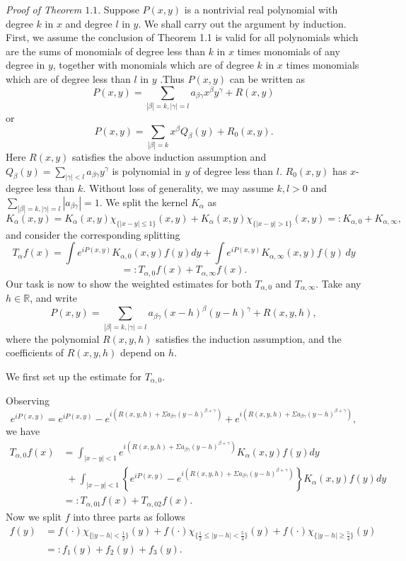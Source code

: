 \documentclass[reqno,12pt]{amsart}
\numberwithin{equation}{section}
\theoremstyle{plain}
\theoremstyle{definition}
\begin{document}
{\it Proof of Theorem $1.1$}. Suppose $P(x,y)$ is a nontrivial real polynomial with degree $k$ in $x$ and degree $l$ in $y$. We shall carry out the argument by induction. First, we assume the conclusion of Theorem 1.1 is valid for all polynomials which are the sums of monomials of degree less than $k$ in $x$ times
monomials of any degree in $y$, together with monomials which are of degree $k$ in $x$  times monomials which are of degree less than $l$ in $y$ .Thus $P(x,y)$ can be written as
$$
P(x,y)=\sum_{|\beta|=k,|\gamma|=l}a_{\beta\gamma}x^{\beta}y^{\gamma}+R(x,y)
$$
or
$$
P(x,y)=\sum_{|\beta|=k}x^{\beta}Q_{\beta}(y)+R_{0}(x,y).
$$
Here $R(x,y)$ satisfies the above induction assumption and $Q_{\beta}(y)=\sum_{|\gamma|<l}a_{\beta\gamma}y^{\gamma}$ is polynomial in $y$ of degree less than $l$. $R_{0}(x,y)$ has $x$-degree less than $k$. Without loss of generality, we may assume $k,l>0$ and $\sum_{|\beta|=k,|\gamma|=l}|a_{\beta\gamma}|=1.$ We split the kernel $K_{\alpha}$ as
$$
K_{\alpha}(x,y)=K_{\alpha}(x,y)\chi_{\{|x-y|\leq1\}}(x,y)+K_{\alpha}(x,y)\chi_{\{|x-y|>1\}}(x,y)=:K_{\alpha,0}+K_{\alpha,\infty},
$$
and consider the corresponding splitting
$$
T_{\alpha}f(x)=\int e^{iP(x,y)}K_{\alpha,0}(x,y)f(y)dy+\int e^{iP(x,y)}K_{\alpha,\infty}(x,y)f(y)\,dy
$$
$$
=:T_{\alpha,0}f(x)+T_{\alpha,\infty}f(x).
$$
Our task is now to show the weighted estimates for both $T_{\alpha,0}$ and $T_{\alpha,\infty}$.
Take any $h\in \mathbb{R}$, and write
$$
P(x,y)=\sum_{|\beta|=k,|\gamma|=l}a_{\beta\gamma}(x-h)^{\beta}(y-h)^{\gamma}+R(x,y,h),
$$
where the polynomial $R(x,y,h)$ satisfies the induction assumption, and the coefficients of $R(x,y,h)$ depend on $h$.

We first set up the estimate for $T_{\alpha,0}$.

Observing $$e^{iP(x,y)}=e^{iP(x,y)}-e^{i(R(x,y,h)+\Sigma a_{\beta\gamma}(y-h)^{\beta+\gamma})}+e^{i(R(x,y,h)+\Sigma a_{\beta\gamma}(y-h)^{\beta+\gamma})},$$ we have
$$\begin{array}{rl}
\displaystyle T_{\alpha,0}f(x)&=\displaystyle \int_{|x-y|<1}e^{i(R(x,y,h)+\Sigma a_{\beta\gamma}(y-h)^{\beta+\gamma})}K_{\alpha}(x,y)f(y)dy\\
&\,\,+\displaystyle \int_{|x-y|<1}\left\{e^{iP(x,y)}-e^{i(R(x,y,h)+\Sigma a_{\beta\gamma}(y-h)^{\beta+\gamma})}\right\}K_{\alpha}(x,y)f(y)dy\\&=:\displaystyle T_{\alpha,01}f(x)+T_{\alpha,02}f(x).
\end{array}$$
Now we split $f$ into three parts as follows
$$\begin{array}{rl}
\displaystyle f(y)&=\displaystyle f(\cdot)\chi_{\{|y-h|<\frac{1}{2}\}}(y)+f(\cdot)\chi_{\{\frac{1}{2}\leq|y-h|<\frac{5}{4}\}}(y)+f(\cdot)\chi_{\{|y-h|\geq\frac{5}{4}\}}(y)\\
&=:f_{1}(y)+f_{2}(y)+f_{3}(y).
\end{array}$$
\end{document}
